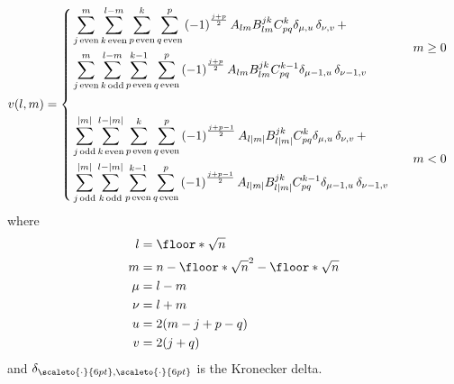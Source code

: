 \begin{align}
    \label{eq:pn}
    v(l, m) &=
    \begin{dcases}
        \!\begin{aligned}%
            &
                \sum_{j\, \mathrm{even}}^m
                \sum_{k\, \mathrm{even}}^{l-m}
                \sum_{p\,\mathrm{even}}^{k}
                \sum_{q\,\mathrm{even}}^p
                \left(-1\right)^{\frac{j+p}{2}}
                A_{lm}
                B_{lm}^{jk}
                C_{pq}^{k}
                \delta_{\mu, u} \, \delta_{\nu, v}
            \, + \\
            &
                \sum_{j\, \mathrm{even}}^m
                \sum_{k\, \mathrm{odd}}^{l-m}
                \sum_{p\,\mathrm{even}}^{k - 1}
                \sum_{q\,\mathrm{even}}^p
                \left(-1\right)^{\frac{j+p}{2}}
                A_{lm}
                B_{lm}^{jk}
                C_{pq}^{k - 1}
                \delta_{\mu-1, u} \, \delta_{\nu-1, v}
       \end{aligned}
       &
       \quad m \ge 0 \\
       \\
       \!\begin{aligned}%
           &
               \sum_{j\, \mathrm{odd}}^{|m|}
               \sum_{k\, \mathrm{even}}^{l-|m|}
               \sum_{p\,\mathrm{even}}^{k}
               \sum_{q\,\mathrm{even}}^p
               \left(-1\right)^{\frac{j+p-1}{2}}
               A_{l|m|}
               B_{l|m|}^{jk}
               C_{pq}^{k}
               \delta_{\mu, u} \, \delta_{\nu, v}
           \, + \\
           &
               \sum_{j\, \mathrm{odd}}^{|m|}
               \sum_{k\, \mathrm{odd}}^{l-|m|}
               \sum_{p\,\mathrm{even}}^{k - 1}
               \sum_{q\,\mathrm{even}}^p
               \left(-1\right)^{\frac{j+p-1}{2}}
               A_{l|m|}
               B_{l|m|}^{jk}
               C_{pq}^{k - 1}
               \delta_{\mu-1, u} \, \delta_{\nu-1, v}
      \end{aligned}
      &
      \quad m < 0
   \end{dcases}
\end{align}
%
where
%
\begin{align}
    l &= \floor*{\sqrt{n}} \nonumber \\
    m &= n - \floor*{\sqrt{n}}^2 - \floor*{\sqrt{n}} \nonumber \\
    \mu &= l - m \nonumber \\
    \nu &= l + m \nonumber \\
    u &= 2(m - j + p - q) \nonumber \\
    v &= 2(j + q)
\end{align}
%
and $\delta_{{\scaleto{\cdot}{6pt},\scaleto{\cdot}{6pt}}}$ is the Kronecker
delta.
